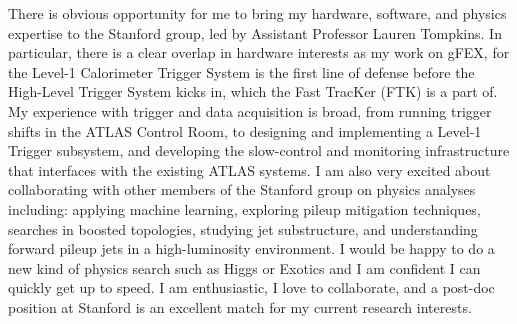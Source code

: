 

There is obvious opportunity for me to bring my hardware, software, and physics expertise to the Stanford group, led by Assistant Professor Lauren Tompkins. In particular, there is a clear overlap in hardware interests as my work on gFEX, for the Level-1 Calorimeter Trigger System is the first line of defense before the High-Level Trigger System kicks in, which the Fast TracKer (FTK) is a part of. My experience with trigger and data acquisition is broad, from running trigger shifts in the ATLAS Control Room, to designing and implementing a Level-1 Trigger subsystem, and developing the slow-control and monitoring infrastructure that interfaces with the existing ATLAS systems. I am also very excited about collaborating with other members of the Stanford group on physics analyses including: applying machine learning, exploring pileup mitigation techniques, searches in boosted topologies, studying jet substructure, and understanding forward pileup jets in a high-luminosity environment. I would be happy to do a new kind of physics search such as Higgs or Exotics and I am confident I can quickly get up to speed. I am enthusiastic, I love to collaborate, and a post-doc position at Stanford is an excellent match for my current research interests.


